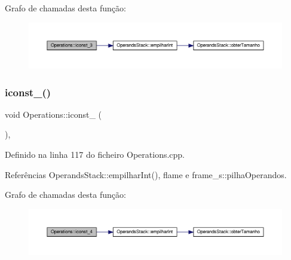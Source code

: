 Grafo de chamadas desta função\+:
\nopagebreak
\begin{figure}[H]
\begin{center}
\leavevmode
\includegraphics[width=350pt]{classOperations_ab8466864c000152e75172b623704f610_cgraph}
\end{center}
\end{figure}
\mbox{\label{classOperations_a5fad2dad3d79c889728a6687f36e1192}} 
\subsubsection{\texorpdfstring{iconst\+\_()}{iconst\_4()}}
{\footnotesize\ttfamily void Operations\+::iconst\+\_ (\begin{DoxyParamCaption}{ }\end{DoxyParamCaption})\hspace{0.3cm}{\ttfamily [static]}, {\ttfamily [private]}}



Definido na linha 117 do ficheiro Operations.\+cpp.



Referências Operands\+Stack\+::empilhar\+Int(), flame e frame\+\_\+s\+::pilha\+Operandos.

Grafo de chamadas desta função\+:
\nopagebreak
\begin{figure}[H]
\begin{center}
\leavevmode
\includegraphics[width=350pt]{classOperations_a5fad2dad3d79c889728a6687f36e1192_cgraph}
\end{center}
\end{figure}
\mbox{\label{classOperations_a87a4c7214825d084ded4a8ea50e4af7c}} 
